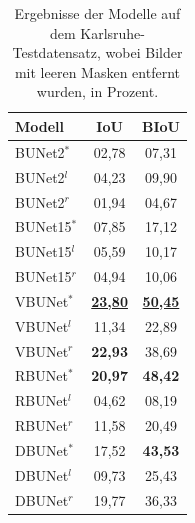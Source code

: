 \begin{table}[ht]
	\centering
	\begin{tabular}{l|cc}
		Modell & \ac{IoU} & \ac{BIoU}  \\
		\midrule
        BUNet2$^*$ & 02,78 & 07,31  \\ 
        BUNet2$^l$ & 04,23 & 09,90  \\ 
        BUNet2$^r$ & 01,94 & 04,67  \\ 
		\midrule

        BUNet15$^*$ & 07,85 & 17,12  \\ 
        BUNet15$^l$ & 05,59 & 10,17  \\ 
        BUNet15$^r$ & 04,94 & 10,06  \\ 
		\midrule

        VBUNet$^*$ & \underline{\textbf{23,80}} & \underline{\textbf{50,45}} \\ 
        VBUNet$^l$ & 11,34 & 22,89 \\ 
        VBUNet$^r$ & \textbf{22,93} & 38,69 \\ 
		\midrule

        RBUNet$^*$ & \textbf{20,97} & \textbf{48,42} \\ 
        RBUNet$^l$ & 04,62 & 08,19 \\ 
        RBUNet$^r$ & 11,58 & 20,49 \\ 
		\midrule

        DBUNet$^*$ & 17,52 & \textbf{43,53} \\ 
        DBUNet$^l$ & 09,73 & 25,43 \\ 
        DBUNet$^r$ & 19,77 & 36,33 \\ 
        
	\end{tabular}
	\caption{Ergebnisse der Modelle auf dem Karlsruhe-Testdatensatz, wobei Bilder mit leeren Masken entfernt wurden, 
    in Prozent.}
	\label{tab:results-ka-small}
\end{table}

